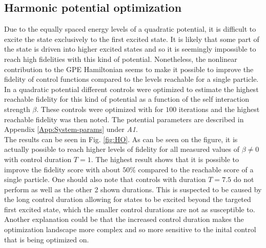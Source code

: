 \documentclass[a4paper, twocolumn]{revtex4-1}
\begin{document}
\subsection{Harmonic potential optimization}
Due to the equally spaced energy levels of a quadratic potential, it is difficult to excite the state exclusively to the first excited state. It is likely that some part of the state is driven into higher excited states and so it is seemingly impossible to reach high fidelities with this kind of potential. Nonetheless, the nonlinear contribution to the GPE Hamiltonian seems to make it possible to improve the fidelity of control functions compared to the levels reachable for a single particle. In a quadratic potential different controls were optimized to estimate the highest reachable fidelity for this kind of potential as a function of the self interaction strength $\beta$. These controls were optimized with  for $100$ iterations and the highest reachable fidelity was then noted. The potential parameters are described in Appendix \ref{App:System-params} under \textit{A1}. \\

The results can be seen in Fig. \ref{fig:HO}. As can be seen on the figure, it is actually possible to reach higher levels of fidelity for all measured values of $\beta \neq 0$ with control duration $T = 1$. The highest result shows that it is possible to improve the fidelity score with about $50\%$ compared to the reachable score of a single particle. One should also note that controls with duration $T=7.5$ do not perform as well as the other 2 shown durations. This is suspected to be caused by the long control duration allowing for states to be excited beyond the targeted first excited state, which the smaller control durations are not as susceptible to. Another explanation could be that the increased control duration makes the optimization landscape more complex and so more sensitive to the inital control that is being optimized on.
\end{document}
